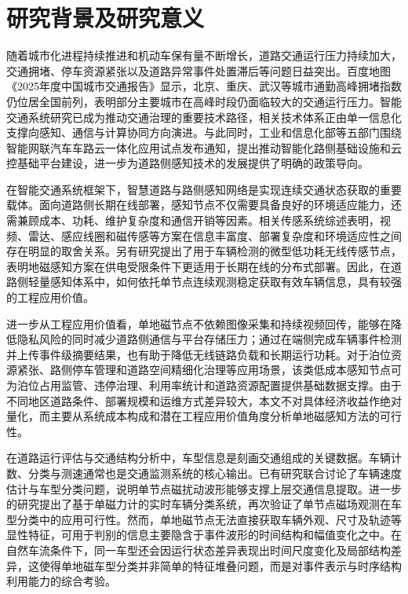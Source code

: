 \documentclass{xdupgthesis}
\begin{document}
\section{研究背景及研究意义}
\label{sec:intro_background}

随着城市化进程持续推进和机动车保有量不断增长，道路交通运行压力持续加大，交通拥堵、停车资源紧张以及道路异常事件处置滞后等问题日益突出。百度地图《2025年度中国城市交通报告》显示，北京、重庆、武汉等城市通勤高峰拥堵指数仍位居全国前列，表明部分主要城市在高峰时段仍面临较大的交通运行压力\cite{R02}。智能交通系统研究已成为推动交通治理的重要技术路径，相关技术体系正由单一信息化支撑向感知、通信与计算协同方向演进\cite{wang2023transportation5}。与此同时，工业和信息化部等五部门围绕智能网联汽车车路云一体化应用试点发布通知，提出推动智能化路侧基础设施和云控基础平台建设，进一步为道路侧感知技术的发展提供了明确的政策导向\cite{R01}。

在智能交通系统框架下，智慧道路与路侧感知网络是实现连续交通状态获取的重要载体。面向道路侧长期在线部署，感知节点不仅需要具备良好的环境适应能力，还需兼顾成本、功耗、维护复杂度和通信开销等因素。相关传感系统综述表明，视频、雷达、感应线圈和磁传感等方案在信息丰富度、部署复杂度和环境适应性之间存在明显的取舍关系\cite{ch2_micko2023roadsensor}。另有研究提出了用于车辆检测的微型低功耗无线传感节点，表明地磁感知方案在供电受限条件下更适用于长期在线的分布式部署\cite{chovanec2014tinywsn}。因此，在道路侧轻量感知体系中，如何依托单节点连续观测稳定获取有效车辆信息，具有较强的工程应用价值。

进一步从工程应用价值看，单地磁节点不依赖图像采集和持续视频回传，能够在降低隐私风险的同时减少道路侧通信与平台存储压力；通过在端侧完成车辆事件检测并上传事件级摘要结果，也有助于降低无线链路负载和长期运行功耗。对于泊位资源紧张、路侧停车管理和道路空间精细化治理等应用场景，该类低成本感知节点可为泊位占用监管、违停治理、利用率统计和道路资源配置提供基础数据支撑。由于不同地区道路条件、部署规模和运维方式差异较大，本文不对具体经济收益作绝对量化，而主要从系统成本构成和潜在工程应用价值角度分析单地磁感知方法的可行性。

在道路运行评估与交通结构分析中，车型信息是刻画交通组成的关键数据。车辆计数、分类与测速通常也是交通监测系统的核心输出\cite{taghvaeeyan2014portable}。已有研究联合讨论了车辆速度估计与车型分类问题，说明单节点磁扰动波形能够支撑上层交通信息提取\cite{feng2022magmonitor}。进一步的研究提出了基于单磁力计的实时车辆分类系统，再次验证了单节点磁场观测在车型分类中的应用可行性\cite{ch3_sarcevic2022singlemag}。然而，单地磁节点无法直接获取车辆外观、尺寸及轨迹等显性特征，可用于判别的信息主要隐含于事件波形的时间结构和幅值变化之中。在自然车流条件下，同一车型还会因运行状态差异表现出时间尺度变化及局部结构差异，这使得单地磁车型分类并非简单的特征堆叠问题，而是对事件表示与时序结构利用能力的综合考验。
\end{document}
